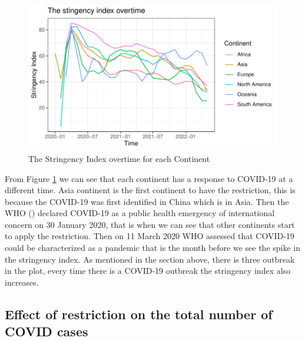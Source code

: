 \documentclass[11pt,a4paper,]{article}
\begin{document}
\begin{figure}

{\centering \includegraphics{report_files/figure-latex/stringency-index-1} 

}

\caption{The Stringency Index overtime for each Continent}\label{fig:stringency-index}
\end{figure}

From Figure \ref{fig:stringency-index} we can see that each continent has a response to COVID-19 at a different time. Asia continent is the first continent to have the restriction, this is because the COVID-19 was first identified in China which is in Asia. Then the WHO (\textcite{who}) declared COVID-19 as a public health emergency of international concern on 30 January 2020, that is when we can see that other continents start to apply the restriction. Then on 11 March 2020 WHO assessed that COVID-19 could be characterized as a pandemic that is the month before we see the spike in the stringency index. As mentioned in the section above, there is three outbreak in the plot, every time there is a COVID-19 outbreak the stringency index also increases.

\clearpage

\subsection*{Effect of restriction on the total number of COVID cases}
\end{document}
